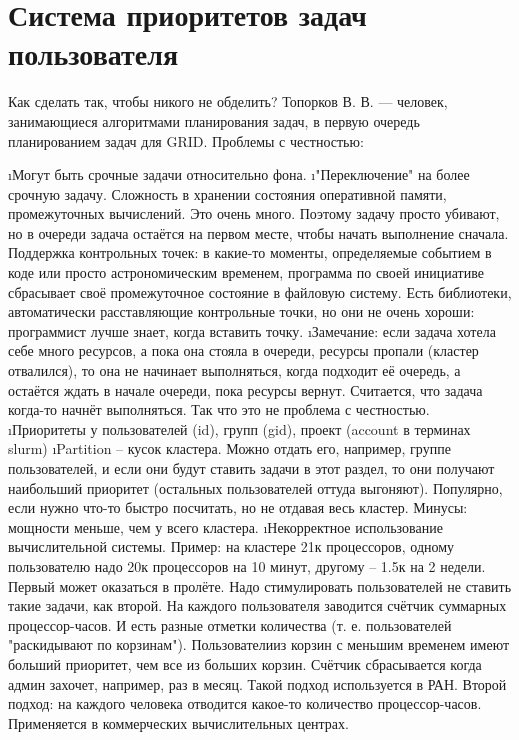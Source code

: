 \section{Система приоритетов задач пользователя}
Как сделать так, чтобы никого не обделить?
Топорков В. В. --- человек, занимающиеся алгоритмами планирования задач, в первую очередь планированием задач для GRID.
Проблемы с честностью:
\begin{enumerate}
	\i Могут быть срочные задачи относительно фона.
	\i "Переключение" на более срочную задачу. Сложность в хранении состояния оперативной памяти, промежуточных вычислений. Это очень много. Поэтому задачу просто убивают, но в очереди задача остаётся на первом месте, чтобы начать выполнение сначала.
	Поддержка контрольных точек: в какие-то моменты, определяемые событием в коде или просто астрономическим временем, программа по своей инициативе сбрасывает своё промежуточное состояние в файловую систему. Есть библиотеки, автоматически расставляющие контрольные точки, но они не очень хороши: программист лучше знает, когда вставить точку.
	\i Замечание: если задача хотела себе много ресурсов, а пока она стояла в очереди, ресурсы пропали (кластер отвалился), то она не начинает выполняться, когда подходит её очередь, а остаётся ждать в начале очереди, пока ресурсы вернут. Считается, что задача когда-то начнёт выполняться. Так что это не проблема с честностью.
	\i Приоритеты у пользователей (id), групп (gid), проект (account в терминах slurm)
	\i Partition -- кусок кластера. Можно отдать его, например, группе пользователей, и если они будут ставить задачи в этот раздел, то они получают наибольший приоритет (остальных пользователей оттуда выгоняют). Популярно, если нужно что-то быстро посчитать, но не отдавая весь кластер. Минусы: мощности меньше, чем у всего кластера.
	\i Некорректное использование вычислительной системы.
	Пример: на кластере 21к процессоров, одному пользователю надо 20к процессоров на 10 минут, другому -- 1.5к на 2 недели. Первый может оказаться в пролёте.
	Надо стимулировать пользователей не ставить такие задачи, как второй. На каждого пользователя заводится счётчик суммарных процессор-часов. И есть разные отметки количества (т. е. пользователей "раскидывают по корзинам"). Пользователииз корзин с меньшим временем имеют больший приоритет, чем все из больших корзин. Счётчик сбрасывается когда админ захочет, например, раз в месяц. Такой подход используется в РАН.
	Второй подход: на каждого человека отводится какое-то количество процессор-часов. Применяется в коммерческих вычислительных центрах.
	

\end{enumerate}
